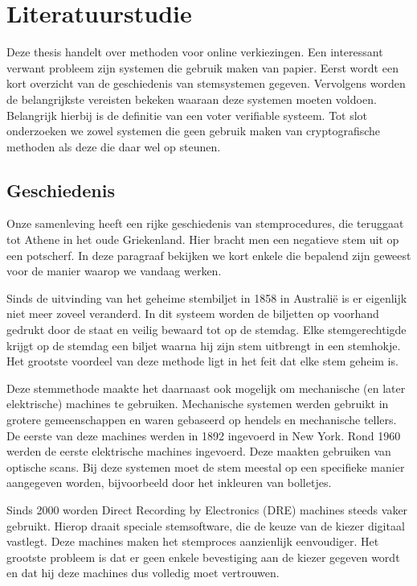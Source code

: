 % 
%

\chapter{Literatuurstudie}
\label{chap:literatuurstudie}

Deze thesis handelt over methoden voor online verkiezingen. Een interessant verwant probleem zijn systemen die gebruik maken van papier. Eerst wordt een kort overzicht van de geschiedenis van stemsystemen gegeven. Vervolgens worden de belangrijkste vereisten bekeken waaraan deze systemen moeten voldoen. Belangrijk hierbij is de definitie van een voter verifiable systeem. Tot slot onderzoeken we zowel systemen die geen gebruik maken van cryptografische methoden als deze die daar wel op steunen.

\section{Geschiedenis~\cite{adida_advances_in_cryptographic_voting_systems}}

Onze samenleving heeft een rijke geschiedenis van stemprocedures, die teruggaat tot Athene in het oude Griekenland. Hier bracht men een negatieve stem uit op een potscherf. In deze paragraaf bekijken we kort enkele die bepalend zijn geweest voor de manier waarop we vandaag werken.\cite{wiki:ostracon}

\npar Sinds de uitvinding van het geheime stembiljet in 1858 in Australi\"e is er eigenlijk niet meer zoveel veranderd. In dit systeem worden de biljetten op voorhand gedrukt door de staat en veilig bewaard tot op de stemdag. Elke stemgerechtigde krijgt op de stemdag een biljet waarna hij zijn stem uitbrengt in een stemhokje. Het grootste voordeel van deze methode ligt in het feit dat elke stem geheim is.

\npar Deze stemmethode maakte het daarnaast ook mogelijk om mechanische (en later elektrische) machines te gebruiken. Mechanische systemen werden gebruikt in grotere gemeenschappen en waren gebaseerd op hendels en mechanische tellers. De eerste van deze machines werden in 1892 ingevoerd in New York. Rond 1960 werden de eerste elektrische machines ingevoerd. Deze maakten gebruiken van optische scans. Bij deze systemen moet de stem meestal op een specifieke manier aangegeven worden, bijvoorbeeld door het inkleuren van bolletjes.

\npar Sinds 2000 worden Direct Recording by Electronics (DRE) machines steeds vaker gebruikt. Hierop draait speciale stemsoftware, die de keuze van de kiezer digitaal vastlegt. Deze machines maken het stemproces aanzienlijk eenvoudiger. Het grootste probleem is dat er geen enkele bevestiging aan de kiezer gegeven wordt en dat hij deze machines dus volledig moet vertrouwen.\cite{wiki:dre_voting_machine}

